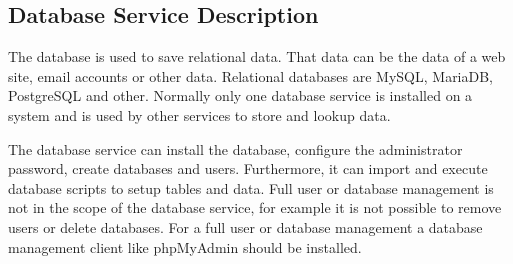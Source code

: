 \subsection{Database Service Description}

The database is used to save relational data. That data can be the data
of a web site, email accounts or other data. Relational databases
are MySQL, MariaDB, PostgreSQL and other. Normally only one database service
is installed on a system and is used by other services to store and lookup 
data.

The database service can install the database, configure the administrator 
password, create databases and users. Furthermore, it can import and execute 
database scripts to setup tables and data. Full user or database management 
is not in the scope of the database service, for example it is not possible
to remove users or delete databases. For a full user or database management
a database management client like phpMyAdmin should be installed.
